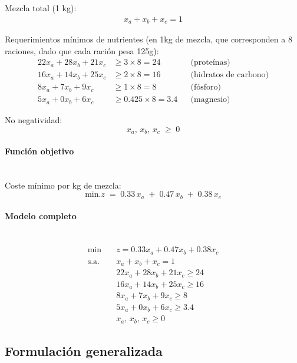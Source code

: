 Mezcla total (1 kg):
\begin{align}
x_a + x_b + x_c = 1
\end{align}


Requerimientos mínimos de nutrientes (en 1kg de mezcla, que corresponden a 8 raciones, dado que cada ración pesa 125g):
\begin{align}
22x_a + 28x_b + 21x_c &\geq 3 \times 8 = 24   && \text{(proteínas)} \\
16x_a + 14x_b + 25x_c &\geq 2 \times 8 = 16   && \text{(hidratos de carbono)} \\
8x_a + 7x_b + 9x_c    &\geq 1 \times 8 = 8    && \text{(fósforo)} \\
5x_a + 0x_b + 6x_c    &\geq 0.425 \times 8 = 3.4 && \text{(magnesio)}
\end{align}



No negatividad:
 \begin{equation}    
x_a,\,x_b,\,x_c \;\ge\; 0
\end{equation}


\paragraph{Función objetivo}\mbox{}\\

Coste mínimo por kg de mezcla:
 \begin{equation}    
\mbox{min.} z \;=\; 0.33\,x_a \;+\; 0.47\,x_b \;+\; 0.38\,x_c
\end{equation}

\paragraph{Modelo completo}\mbox{}\\

\begin{align}
\min \quad & z = 0.33x_a + 0.47x_b + 0.38x_c \\
\text{s.a.} \quad
& x_a + x_b + x_c = 1 \\
& 22x_a + 28x_b + 21x_c \geq 24 \\
& 16x_a + 14x_b + 25x_c \geq 16 \\
& 8x_a + 7x_b + 9x_c \geq 8 \\
& 5x_a + 0x_b + 6x_c \geq 3.4 \\
& x_a,\,x_b,\,x_c \geq 0
\end{align}


\subsection{Formulación generalizada}

